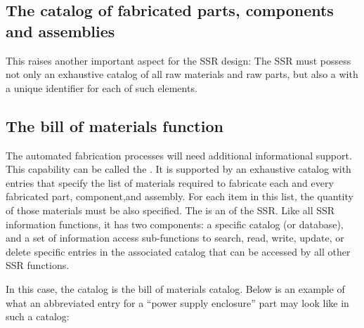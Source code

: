 \subsection[The catalog of fabricated parts, components and assemblies]{The catalog of fabricated parts, components and assemblies}

This raises another
important aspect for the SSR design: The SSR must possess not only an
exhaustive catalog of all raw materials and raw parts, but also a
with a unique identifier for each  of such elements. 

\subsection[The bill of materials function]{The bill of materials function}

The automated fabrication
processes will need additional informational support. 
This capability can be called the . It is supported by
an exhaustive catalog with entries that specify  the list of materials required to fabricate
each and every 
fabricated part, component,and assembly.
For each item in this
list, the quantity of those materials must be also
specified. The  is an  of
the SSR. Like all SSR information functions, it has two components: a specific catalog (or database),
 and a set of information access sub-functions to search, read, write, update, or delete specific entries in 
the associated catalog that can be accessed by all other SSR functions.  

In this case, the catalog
is the bill of materials catalog.  
Below is an example of what an abbreviated
entry for a “power supply enclosure” part may look like in such a catalog:

